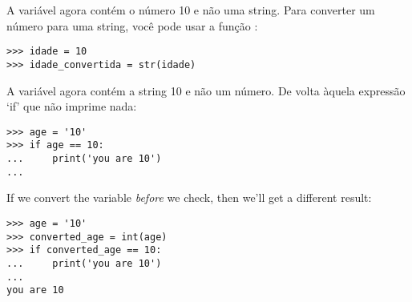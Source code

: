 \noindent
A variável  agora contém o número 10 e não uma string. Para converter um número para uma string, você pode usar a função :

\begin{listing}
\begin{verbatim}
>>> idade = 10
>>> idade_convertida = str(idade)
\end{verbatim}
\end{listing}

\noindent
A variável  agora contém a string 10 e não um número. De volta àquela expressão `if' que não imprime nada:

\begin{listing}
\begin{verbatim}
>>> age = '10'
>>> if age == 10:
...     print('you are 10')
...
\end{verbatim}
\end{listing}

\noindent
If we convert the variable \emph{before} we check, then we'll get a different result:

\begin{listing}
\begin{verbatim}
>>> age = '10'
>>> converted_age = int(age)
>>> if converted_age == 10:
...     print('you are 10')
...
you are 10
\end{verbatim}
\end{listing}

\newpage
